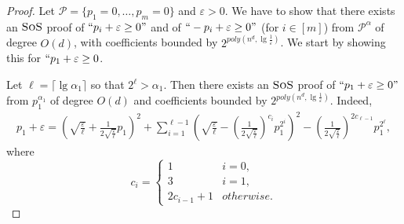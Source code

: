 \documentclass[11pt]{article}
\newcommand{\sos}{\text{\sc{SoS}}}
\newcommand{\1}{\textbf{1}}
\begin{document}
\begin{proof}
    Let $\mathcal{P} = \{p_1 = 0, \dots, p_m=0\}$ and $\varepsilon > 0$. We have to show that there exists an $\sos$ proof of $``p_i + \varepsilon \geq 0"$ and of $``-p_i + \varepsilon \geq 0"$ (for $i \in [m]$) from $\mathcal{P}^{\alpha}$ of degree $O(d)$, with coefficients bounded by $2^{poly(n^d, \lg \frac{1}{\varepsilon})}$. We start by showing this for $``p_1 + \varepsilon \geq 0$.

    Let $\ell = \lceil \lg \alpha_1 \rceil$ so that $2^{\ell} > \alpha_1$. Then there exists an $\sos$ proof of $``p_1 + \varepsilon \geq 0"$ from $p_1^{\alpha_1}$ of degree $O(d)$ and coefficients bounded by $2^{poly(n^d, \lg \frac{1}{\varepsilon})}$. Indeed,
    \begin{align*}
        p_1 + \varepsilon = \left(\sqrt{\frac{\varepsilon}{\ell}} + \frac{1}{2\sqrt{\frac{\varepsilon}{\ell}}} p_1 \right)^2 + \sum_{i=1}^{\ell-1} \left( \sqrt{\frac{\varepsilon}{\ell}} - \left( \frac{1}{2 \sqrt{\frac{\varepsilon}{\ell}}} \right)^{c_i} p_1^{2^i} \right)^2 - \left( \frac{1}{2 \sqrt{\frac{\varepsilon}{\ell}}} \right)^{2c_{\ell-1}} p_1^{2^\ell},
    \end{align*}
    where
    \begin{equation*}
        c_i = 
        \begin{cases}
            1 & i = 0, \\
            3 & i = 1, \\
            2c_{i-1} + 1 & otherwise.
        \end{cases}
    \end{equation*}
\end{proof}
\end{document}

